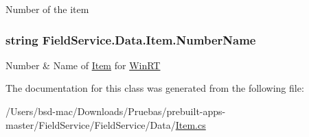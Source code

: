 Number of the item 

\hypertarget{class_field_service_1_1_data_1_1_item_a8c6fcfd07611bc4c3c3a6d6abb56d644}{
\subsubsection[{Number\+Name}]{\setlength{\rightskip}{0pt plus 5cm}string Field\+Service.\+Data.\+Item.\+Number\+Name\hspace{0.3cm}{\ttfamily [get]}}}\label{class_field_service_1_1_data_1_1_item_a8c6fcfd07611bc4c3c3a6d6abb56d644}


Number \& Name of \hyperlink{class_field_service_1_1_data_1_1_item}{Item} for \hyperlink{namespace_field_service_1_1_win_r_t}{Win\+R\+T} 



The documentation for this class was generated from the following file\+:\begin{DoxyCompactItemize}
\item 
/\+Users/bsd-\/mac/\+Downloads/\+Pruebas/prebuilt-\/apps-\/master/\+Field\+Service/\+Field\+Service/\+Data/\hyperlink{_item_8cs}{Item.\+cs}\end{DoxyCompactItemize}
